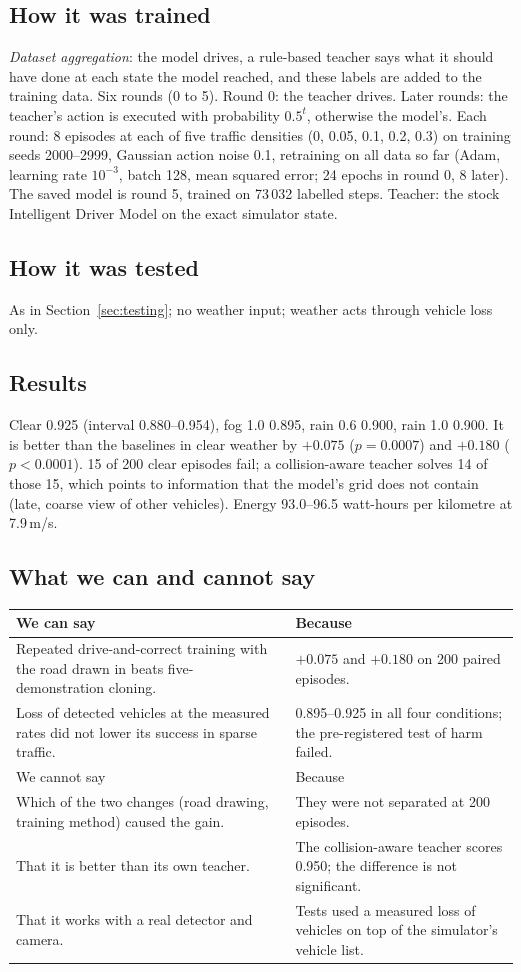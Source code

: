 \documentclass[11pt,a4paper]{article}
\begin{document}
\subsection{How it was trained}
\emph{Dataset aggregation}: the model drives, a rule-based teacher says what it should have done at each state the model reached, and these labels are added to the training data. Six rounds (0 to 5). Round 0: the teacher drives. Later rounds: the teacher's action is executed with probability $0.5^t$, otherwise the model's. Each round: 8 episodes at each of five traffic densities (0, 0.05, 0.1, 0.2, 0.3) on training seeds 2000--2999, Gaussian action noise 0.1, retraining on all data so far (Adam, learning rate $10^{-3}$, batch 128, mean squared error; 24 epochs in round 0, 8 later). The saved model is round 5, trained on 73\,032 labelled steps. Teacher: the stock Intelligent Driver Model on the exact simulator state.
\subsection{How it was tested}
As in Section~\ref{sec:testing}; no weather input; weather acts through vehicle loss only.
\subsection{Results}
Clear 0.925 (interval 0.880--0.954), fog 1.0 0.895, rain 0.6 0.900, rain 1.0 0.900. It is better than the baselines in clear weather by $+0.075$ ($p=0.0007$) and $+0.180$ ($p<0.0001$). 15 of 200 clear episodes fail; a collision-aware teacher solves 14 of those 15, which points to information that the model's grid does not contain (late, coarse view of other vehicles). Energy 93.0--96.5 watt-hours per kilometre at 7.9\,m/s.
\subsection{What we can and cannot say}
\begin{tabularx}{\textwidth}{@{}>{\raggedright\arraybackslash}p{5.2cm}X@{}}\toprule
We can say & Because\\\midrule
Repeated drive-and-correct training with the road drawn in beats five-demonstration cloning. & $+0.075$ and $+0.180$ on 200 paired episodes.\\
Loss of detected vehicles at the measured rates did not lower its success in sparse traffic. & 0.895--0.925 in all four conditions; the pre-registered test of harm failed.\\\midrule
We cannot say & Because\\\midrule
Which of the two changes (road drawing, training method) caused the gain. & They were not separated at 200 episodes.\\
That it is better than its own teacher. & The collision-aware teacher scores 0.950; the difference is not significant.\\
That it works with a real detector and camera. & Tests used a measured loss of vehicles on top of the simulator's vehicle list.\\\bottomrule
\end{tabularx}
\end{document}
